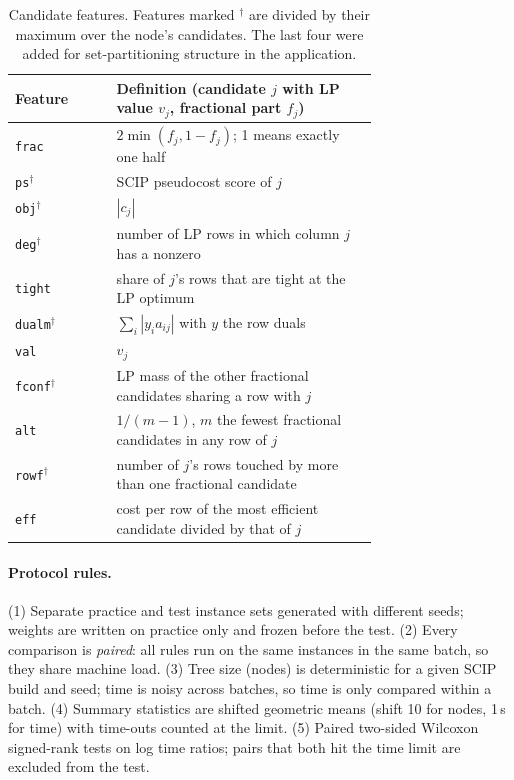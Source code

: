 \documentclass[11pt]{article}
\begin{document}
\begin{table}[!htbp]
\centering\small
\caption{Candidate features. Features marked $^\dagger$ are divided by their maximum over the
node's candidates. The last four were added for set-partitioning structure in the application.}
\label{tab:features}
\begin{tabular}{@{}lp{0.72\linewidth}@{}}
\toprule
Feature & Definition (candidate $j$ with LP value $v_j$, fractional part $f_j$) \\
\midrule
\texttt{frac} & $2\min(f_j, 1-f_j)$; 1 means exactly one half \\
\texttt{ps}$^\dagger$ & SCIP pseudocost score of $j$ \\
\texttt{obj}$^\dagger$ & $|c_j|$ \\
\texttt{deg}$^\dagger$ & number of LP rows in which column $j$ has a nonzero \\
\texttt{tight} & share of $j$'s rows that are tight at the LP optimum \\
\texttt{dualm}$^\dagger$ & $\sum_i |y_i a_{ij}|$ with $y$ the row duals \\
\texttt{val} & $v_j$ \\
\texttt{fconf}$^\dagger$ & LP mass of the other fractional candidates sharing a row with $j$ \\
\texttt{alt} & $1/(m-1)$, $m$ the fewest fractional candidates in any row of $j$ \\
\texttt{rowf}$^\dagger$ & number of $j$'s rows touched by more than one fractional candidate \\
\texttt{eff} & cost per row of the most efficient candidate divided by that of $j$ \\
\bottomrule
\end{tabular}
\end{table}

\paragraph{Protocol rules.} (1) Separate practice and test instance sets generated with different
seeds; weights are written on practice only and frozen before the test. (2) Every comparison is
\emph{paired}: all rules run on the same instances in the same batch, so they share machine load.
(3) Tree size (nodes) is deterministic for a given SCIP build and seed; time is noisy across
batches, so time is only compared within a batch. (4) Summary statistics are shifted geometric
means (shift 10 for nodes, 1\,s for time) with time-outs counted at the limit. (5) Paired
two-sided Wilcoxon signed-rank tests on log time ratios; pairs that both hit the time limit are
excluded from the test.
\end{document}

